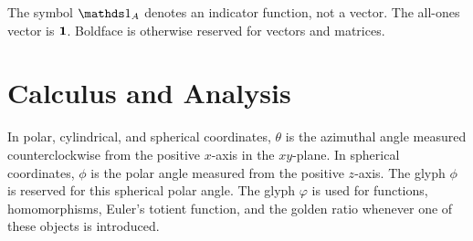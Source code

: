     The symbol $\indicator{A}$ denotes an indicator function, not a vector.
    The all-ones vector is $\mathbf{1}$. Boldface is otherwise reserved for vectors
    and matrices.

    \section*{Calculus and Analysis}

    In polar, cylindrical, and spherical coordinates, $\theta$ is the azimuthal
    angle measured counterclockwise from the positive $x$-axis in the
    $xy$-plane. In spherical coordinates, $\phi$ is the polar angle measured
    from the positive $z$-axis. The glyph $\phi$ is reserved for this spherical
    polar angle. The glyph $\varphi$ is used for functions, homomorphisms,
    Euler's totient function, and the golden ratio whenever one of these objects
    is introduced.

    \vspace{0.5em}

